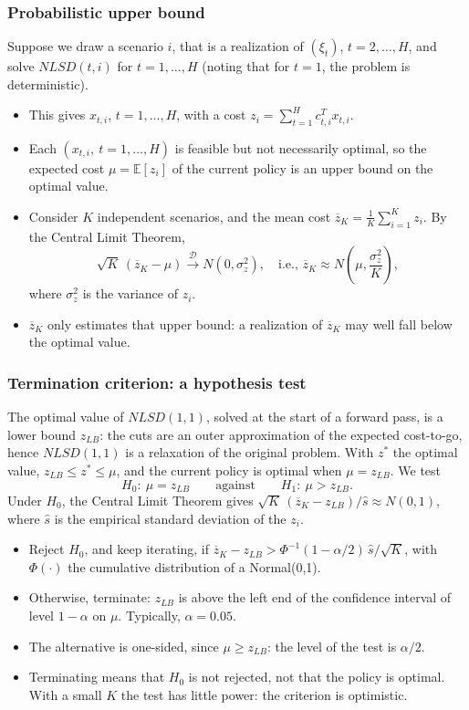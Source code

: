 \documentclass[aspectratio=169]{beamer}
\def\EE{\mathbb{E}}
\begin{document}
\begin{frame}
\frametitle{Probabilistic upper bound}

Suppose we draw a scenario $i$, that is a realization of $(\xi_{t})$, $t = 2,\ldots,H$, and
solve $NLSD(t, i)$ for $t = 1,\ldots,H$ (noting that for $t = 1$, the problem is
deterministic).
\begin{itemize}
\item
This gives $x_{t,i}$, $t = 1,\ldots,H$, with a cost $z_i = \sum_{t=1}^H c_{t,i}^Tx_{t,i}$.
\item
Each $(x_{t,i},\ t = 1,\ldots,H)$ is feasible but not necessarily optimal, so the expected
cost $\mu = \EE[z_i]$ of the current policy is an upper bound on the optimal value.
\item
Consider $K$ independent scenarios, and the mean cost
$
\overline{z}_K = \frac{1}{K} \sum_{i=1}^K z_i.
$
By the Central Limit Theorem,
$$
\sqrt{K}\,(\overline{z}_K - \mu) \overset{\mathcal{D}}{\rightarrow} N(0, \sigma_z^2),
\quad \text{i.e., } \overline{z}_K \approx N\left(\mu, \frac{\sigma_z^2}{K}\right),
$$
where $\sigma_z^2$ is the variance of $z_i$.
\item
$\overline{z}_K$ only estimates that upper bound: a realization of $\overline{z}_K$ may well
fall below the optimal value.
\end{itemize}

\end{frame}

\begin{frame}
\frametitle{Termination criterion: a hypothesis test}

{\small
The optimal value of $NLSD(1, 1)$, solved at the start of a forward pass, is a lower bound $z_{LB}$:
the cuts are an outer approximation of the expected cost-to-go, hence $NLSD(1,1)$ is a relaxation of
the original problem. With $z^*$ the optimal value, $z_{LB} \leq z^* \leq \mu$, and the current policy is optimal when
$\mu = z_{LB}$. We test
$$
H_0:\ \mu = z_{LB} \qquad \text{against} \qquad H_1:\ \mu > z_{LB}.
$$
Under $H_0$, the Central Limit Theorem gives
$\sqrt{K}\,(\overline{z}_K - z_{LB})/\hat{s} \approx N(0,1)$,
where $\hat{s}$ is the empirical standard deviation of the $z_i$.
\begin{itemize}
\item
Reject $H_0$, and keep iterating, if
$\overline{z}_K - z_{LB} > \Phi^{-1}(1-\alpha/2)\, \hat{s}/\sqrt{K}$,
with $\Phi(\cdot)$ the cumulative distribution of a Normal(0,1).
\item
Otherwise, terminate: $z_{LB}$ is above the left end of the confidence interval of level $1 - \alpha$
on $\mu$. Typically, $\alpha = 0.05$.
\item
The alternative is one-sided, since $\mu \geq z_{LB}$: the level of the test is $\alpha/2$.
\item
Terminating means that $H_0$ is not rejected, not that the policy is optimal. With a small $K$ the
test has little power: the criterion is optimistic.
\end{itemize}
}

\end{frame}
\end{document}
